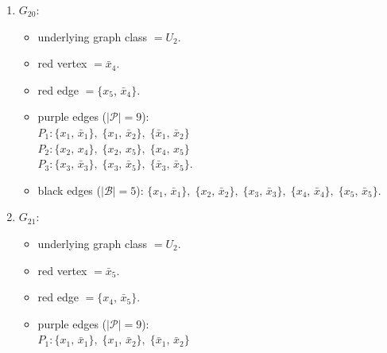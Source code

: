 \begin{enumerate}[leftmargin=*]
\begin{itemize}[leftmargin=*]
\item underlying graph class $= U_3$.
\item red vertex $= x_{3}$.
\item red edge $= \{x_{3},\,\bar{x}_{2}\}$.
\item purple edges ($|\mathcal{P}|=9$):\mbox{}\\
$P_{1}: \{x_{1},\,\bar{x}_{1}\},\; \{x_{1},\,\bar{x}_{2}\},\; \{\bar{x}_{1},\,\bar{x}_{2}\}$\\
$P_{2}: \{x_{2},\,x_{4}\},\; \{x_{2},\,x_{5}\},\; \{x_{4},\,x_{5}\}$\\
$P_{3}: \{\bar{x}_{3},\,\bar{x}_{4}\},\; \{\bar{x}_{3},\,\bar{x}_{5}\},\; \{\bar{x}_{4},\,\bar{x}_{5}\}$.
\item black edges ($|\mathcal{B}|=5$): $\{x_{1},\,\bar{x}_{1}\},\; \{x_{2},\,\bar{x}_{2}\},\; \{x_{3},\,\bar{x}_{3}\},\; \{x_{4},\,\bar{x}_{4}\},\; \{x_{5},\,\bar{x}_{5}\}$.
\end{itemize}
\item $G_{20}$:
\begin{itemize}[leftmargin=*]
\item underlying graph class $= U_2$.
\item red vertex $= \bar{x}_{4}$.
\item red edge $= \{x_{5},\,\bar{x}_{4}\}$.
\item purple edges ($|\mathcal{P}|=9$):\mbox{}\\
$P_{1}: \{x_{1},\,\bar{x}_{1}\},\; \{x_{1},\,\bar{x}_{2}\},\; \{\bar{x}_{1},\,\bar{x}_{2}\}$\\
$P_{2}: \{x_{2},\,x_{4}\},\; \{x_{2},\,x_{5}\},\; \{x_{4},\,x_{5}\}$\\
$P_{3}: \{x_{3},\,\bar{x}_{3}\},\; \{x_{3},\,\bar{x}_{5}\},\; \{\bar{x}_{3},\,\bar{x}_{5}\}$.
\item black edges ($|\mathcal{B}|=5$): $\{x_{1},\,\bar{x}_{1}\},\; \{x_{2},\,\bar{x}_{2}\},\; \{x_{3},\,\bar{x}_{3}\},\; \{x_{4},\,\bar{x}_{4}\},\; \{x_{5},\,\bar{x}_{5}\}$.
\end{itemize}
\item $G_{21}$:
\begin{itemize}[leftmargin=*]
\item underlying graph class $= U_2$.
\item red vertex $= \bar{x}_{5}$.
\item red edge $= \{x_{4},\,\bar{x}_{5}\}$.
\item purple edges ($|\mathcal{P}|=9$):\mbox{}\\
$P_{1}: \{x_{1},\,\bar{x}_{1}\},\; \{x_{1},\,\bar{x}_{2}\},\; \{\bar{x}_{1},\,\bar{x}_{2}\}$\\

\end{itemize}
\end{enumerate}
